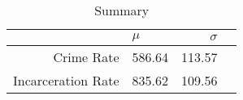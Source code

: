 \documentclass{article}
\begin{document}
  \begin{table}[ht]
    \centering
    \begin{tabular}{rlrr}
      \toprule
                         & $\mu$   & $\sigma$ \\
      \midrule
      Crime Rate         & 586.64 & 113.57 \\
      Incarceration Rate & 835.62 & 109.56 \\
      \bottomrule
    \end{tabular}
    \caption{Summary}
  \end{table}
\end{document}
